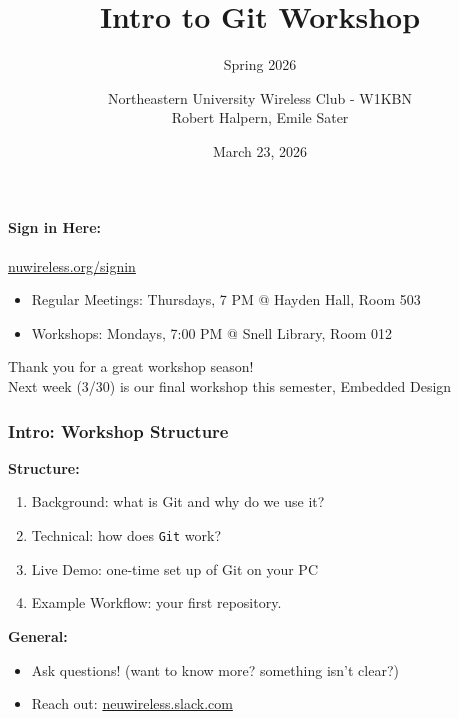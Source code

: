 \documentclass[x11names]{beamer}                            %
\title{Intro to Git Workshop}
\subtitle{Spring 2026}
\author{
  Northeastern University Wireless Club - W1KBN \\
  {\small Robert Halpern, Emile Sater}
  }
\date{March 23, 2026}
\begin{document}
\begin{frame}
  \titlepage
  \vspace{-1cm}
  \begin{center}
    \textbf{Sign in Here:} \\ 
     \\
    {\small \href{https://nuwireless.org/signin}{nuwireless.org/signin}}
  \end{center}
\end{frame}

\begin{frame}
	\begin{tcolorbox}[colframe=black, colback=blue!10, title=About, center title]
	\begin{itemize}
		\item Regular Meetings: Thursdays, 7 PM @ Hayden Hall, Room 503
		\item Workshops: Mondays, 7:00 PM @ Snell Library, Room 012
	\end{itemize}        
	\end{tcolorbox}
	\begin{center}
		\Large Thank you for a great workshop season! \linebreak \\
		\Large Next week (3/30) is our final workshop this semester, Embedded Design
	\end{center}
\end{frame}


\begin{frame}
	\frametitle{Intro: Workshop Structure}
	\centering \textbf{Structure:}
	\begin{enumerate}
		\setlength\itemsep{1em}
		\item Background: what is Git and why do we use it?
		\item Technical: how does \texttt{Git} work?
		\item Live Demo: one-time set up of Git on your PC
		\item Example Workflow: your first repository.
	\end{enumerate}
	\vfill
	\centering \textbf{General:}
	\begin{itemize}
		\setlength\itemsep{1em}
		\item Ask questions!
		      (want to know more? something isn't clear?)
		\item Reach out: \url{neuwireless.slack.com}
	\end{itemize}
\end{frame}
\end{document}
